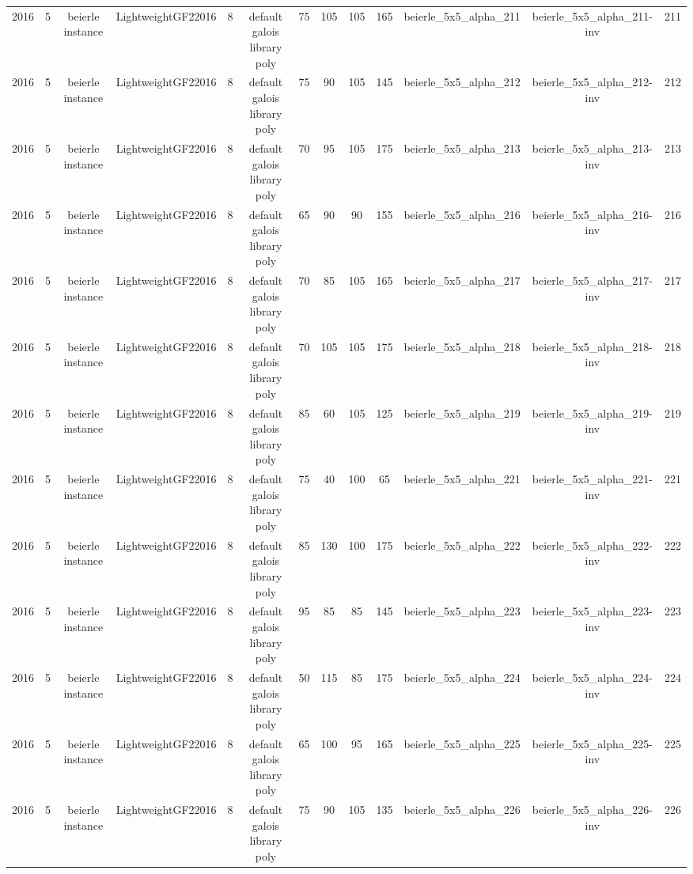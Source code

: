 \begin{tabular}{c c c c c c c c c c c c c}
2016 & 5 & beierle instance & LightweightGF22016 & 8 & default galois library poly & 75 & 105 & 105 & 165 & beierle_5x5_alpha_211 & beierle_5x5_alpha_211-inv & 211 \\
2016 & 5 & beierle instance & LightweightGF22016 & 8 & default galois library poly & 75 & 90 & 105 & 145 & beierle_5x5_alpha_212 & beierle_5x5_alpha_212-inv & 212 \\
2016 & 5 & beierle instance & LightweightGF22016 & 8 & default galois library poly & 70 & 95 & 105 & 175 & beierle_5x5_alpha_213 & beierle_5x5_alpha_213-inv & 213 \\
2016 & 5 & beierle instance & LightweightGF22016 & 8 & default galois library poly & 65 & 90 & 90 & 155 & beierle_5x5_alpha_216 & beierle_5x5_alpha_216-inv & 216 \\
2016 & 5 & beierle instance & LightweightGF22016 & 8 & default galois library poly & 70 & 85 & 105 & 165 & beierle_5x5_alpha_217 & beierle_5x5_alpha_217-inv & 217 \\
2016 & 5 & beierle instance & LightweightGF22016 & 8 & default galois library poly & 70 & 105 & 105 & 175 & beierle_5x5_alpha_218 & beierle_5x5_alpha_218-inv & 218 \\
2016 & 5 & beierle instance & LightweightGF22016 & 8 & default galois library poly & 85 & 60 & 105 & 125 & beierle_5x5_alpha_219 & beierle_5x5_alpha_219-inv & 219 \\
2016 & 5 & beierle instance & LightweightGF22016 & 8 & default galois library poly & 75 & 40 & 100 & 65 & beierle_5x5_alpha_221 & beierle_5x5_alpha_221-inv & 221 \\
2016 & 5 & beierle instance & LightweightGF22016 & 8 & default galois library poly & 85 & 130 & 100 & 175 & beierle_5x5_alpha_222 & beierle_5x5_alpha_222-inv & 222 \\
2016 & 5 & beierle instance & LightweightGF22016 & 8 & default galois library poly & 95 & 85 & 85 & 145 & beierle_5x5_alpha_223 & beierle_5x5_alpha_223-inv & 223 \\
2016 & 5 & beierle instance & LightweightGF22016 & 8 & default galois library poly & 50 & 115 & 85 & 175 & beierle_5x5_alpha_224 & beierle_5x5_alpha_224-inv & 224 \\
2016 & 5 & beierle instance & LightweightGF22016 & 8 & default galois library poly & 65 & 100 & 95 & 165 & beierle_5x5_alpha_225 & beierle_5x5_alpha_225-inv & 225 \\
2016 & 5 & beierle instance & LightweightGF22016 & 8 & default galois library poly & 75 & 90 & 105 & 135 & beierle_5x5_alpha_226 & beierle_5x5_alpha_226-inv & 226 \\

\end{tabular}
